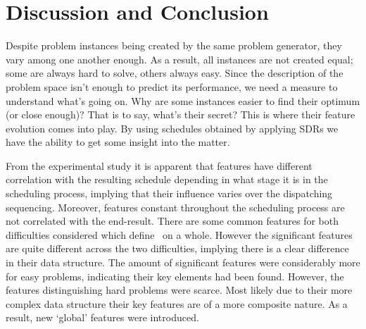 \subsection{\Jrndn}\label{sec:diff:jrndn}
\subsection{\Frnd}\label{sec:diff:frnd}
\subsection{\Frndn}\label{sec:diff:frndn}
\subsection{\Fjc}\label{sec:diff:fjc}
\subsection{\Fmc}\label{sec:diff:fmc}
\subsection{\Fmxc}\label{sec:diff:fmxc}

\section{Discussion and Conclusion}
Despite problem instances being created by the same problem generator, they vary among one another enough. As a result, all instances are not created equal; some are always hard to solve, others always easy. 
Since the description of the problem space isn't enough to predict its performance, we need a measure to understand what's going on. Why are some instances easier to find their optimum (or close enough)? That is to say, what's their secret? This is where their feature evolution comes into play.
By using schedules obtained by applying SDRs we have the ability to get some insight into the matter. 

From the experimental study it is apparent that features have different %
correlation with the resulting schedule depending in what stage it is in the scheduling process, implying that their influence varies over the dispatching sequencing. Moreover, features constant throughout the scheduling process are not correlated with the end-result.
There are some common features for both difficulties considered which define \jsp\ on a whole. However the significant features are quite different across the two difficulties, implying there is a clear difference in their data structure. The amount of significant features were considerably more for easy problems, indicating their key elements had been found. However, the features distinguishing hard problems were scarce. Most likely due to their more complex data structure their key features are of a more composite nature. As a result, new `global' features were introduced. 

